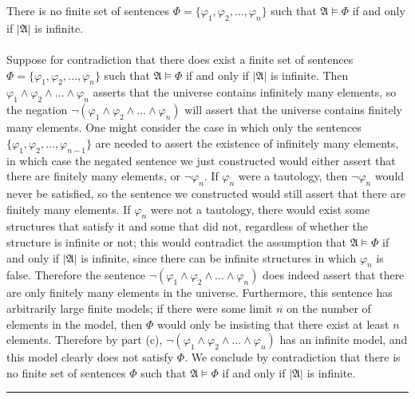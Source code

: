 \documentclass[11pt]{hmcpset}
\newenvironment{problem2}[1]{\noindent {\bf (#1}}
{\medskip}
\newenvironment{proof}{\noindent {\bf Proof:} \\}{\hfill
\rule{1mm}{3mm} \bigskip}
\begin{document}
\begin{problem2}{d)} There is no finite set of sentences $\Phi=\{\varphi_1,\varphi_2,\ldots,\varphi_n\}$ such that $\mathfrak{A}\vDash\Phi$ if and only if $|\mathfrak{A}|$ is infinite.\\
\begin{proof}\indent Suppose for contradiction that there does exist a finite set of sentences $\Phi=\{\varphi_1,\varphi_2,\ldots,\varphi_n\}$ such that $\mathfrak{A}\vDash\Phi$ if and only if $|\mathfrak{A}|$ is infinite. Then $\varphi_1\land \varphi_2\land\ldots\land\varphi_n$ asserts that the universe contains infinitely many elements, so the negation $\neg(\varphi_1\land\varphi_2\land\ldots\land\varphi_n)$ will assert that the universe contains finitely many elements. One might consider the case in which only the sentences $\{\varphi_1,\varphi_2,\ldots,\varphi_{n-1}\}$ are needed to assert the existence of infinitely many elements, in which case the negated sentence we just constructed would either assert that there are finitely many elements, or $\neg\varphi_n$. If $\varphi_n$ were a tautology, then $\neg\varphi_n$ would never be satisfied, so the sentence we constructed would still assert that there are finitely many elements. If $\varphi_n$ were not a tautology, there would exist some structures that satisfy it and some that did not, regardless of whether the structure is infinite or not; this would contradict the assumption that $\mathfrak{A}\vDash\Phi$ if and only if $|\mathfrak{A}|$ is infinite, since there can be infinite structures in which $\varphi_n$ is false. Therefore the sentence $\neg(\varphi_1\land\varphi_2\land\ldots\land\varphi_n)$ does indeed assert that there are only finitely many elements in the universe. Furthermore, this sentence has arbitrarily large finite models; if there were some limit $n$ on the number of elements in the model, then $\Phi$ would only be insisting that there exist at least $n$ elements. Therefore by part (c), $\neg(\varphi_1\land\varphi_2\land\ldots\land\varphi_n)$ has an infinite model, and this model clearly does not satisfy $\Phi$. We conclude by contradiction that there is no finite set of sentences $\Phi$ such that $\mathfrak{A}\vDash\Phi$ if and only if $|\mathfrak{A}|$ is infinite.
\end{proof}
\end{problem2}
\end{document}
